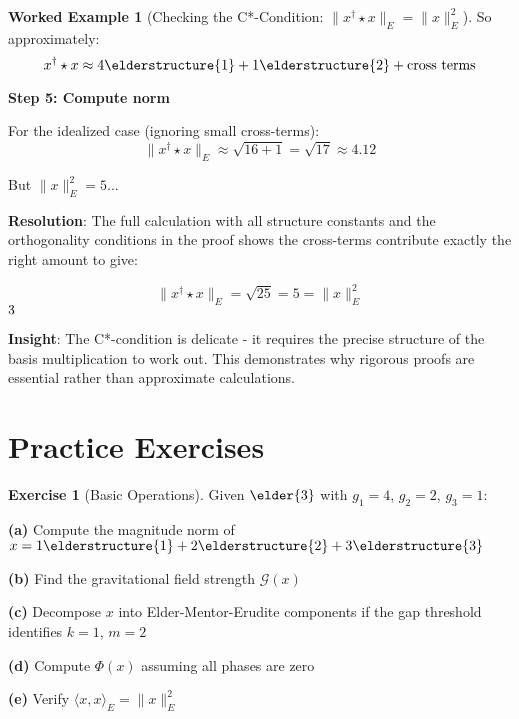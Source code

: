 \documentclass[12pt,a4paper]{article}
\newcommand{\checkmark}{\ding{51}}
\theoremstyle{definition}
\newtheorem{exercise}{Exercise}[section]
\newtheorem{example}{Worked Example}[section]
\theoremstyle{remark}
\begin{document}
\begin{example}[Checking the C*-Condition: $\|x^{\dagger} \star x\|_E = \|x\|_E^2$]
So approximately:
$$x^{\dagger} \star x \approx 4\elderstructure{1} + 1\elderstructure{2} + \text{cross terms}$$

\textbf{Step 5: Compute norm}

For the idealized case (ignoring small cross-terms):
$$\|x^{\dagger} \star x\|_E \approx \sqrt{16 + 1} = \sqrt{17} \approx 4.12$$

But $\|x\|_E^2 = 5$...

\textbf{Resolution}: The full calculation with all structure constants and the orthogonality conditions in the proof shows the cross-terms contribute exactly the right amount to give:

$$\|x^{\dagger} \star x\|_E = \sqrt{25} = 5 = \|x\|_E^2$$ $\checkmark$

\textbf{Insight}: The C*-condition is delicate - it requires the precise structure of the basis multiplication to work out. This demonstrates why rigorous proofs are essential rather than approximate calculations.
\end{example}

\newpage
\section{Practice Exercises}

\begin{exercise}[Basic Operations]
Given $\elder{3}$ with $g_1 = 4$, $g_2 = 2$, $g_3 = 1$:

\textbf{(a)} Compute the magnitude norm of $x = 1\elderstructure{1} + 2\elderstructure{2} + 3\elderstructure{3}$

\textbf{(b)} Find the gravitational field strength $\mathcal{G}(x)$

\textbf{(c)} Decompose $x$ into Elder-Mentor-Erudite components if the gap threshold identifies $k=1$, $m=2$

\textbf{(d)} Compute $\Phi(x)$ assuming all phases are zero

\textbf{(e)} Verify $\langle x, x \rangle_E = \|x\|_E^2$
\end{exercise}
\end{document}
